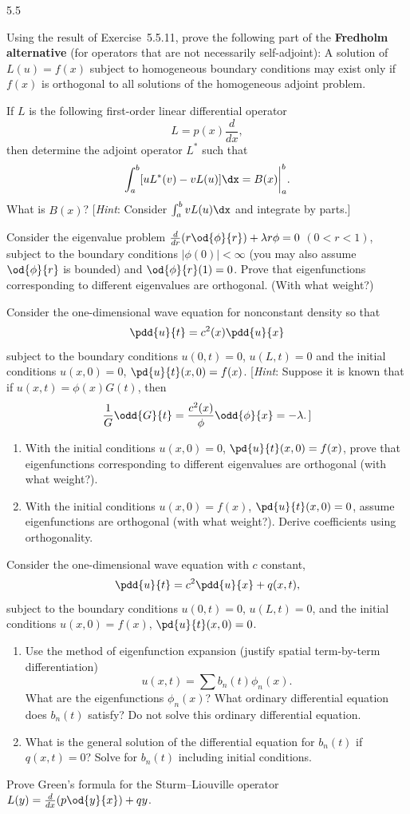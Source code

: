 \begin{exercises}{5.5}
\item Using the result of Exercise~5.5.11, prove the following part of the \textbf{Fredholm alternative} (for operators that are not necessarily self-adjoint): A solution of $L(u) = f(x)$ subject to homogeneous boundary conditions may exist only if $f(x)$ is orthogonal to all solutions of the homogeneous adjoint problem.

\item If $L$ is the following first-order linear differential operator
\[
L = p(x)\frac{d}{d x},
\]
then determine the adjoint operator $L^*$ such that
\[
\int_a^b [uL^*(v) - vL(u)]\dx = B(x)\bigg|_a^b.
\]
What is $B(x)$?  [\textit{Hint}: Consider $\int_a^b vL(u)\dx$ and integrate by parts.]

\item Consider the eigenvalue problem $\frac{d}{d r}(r\od{\phi}{r}) + \lambda r\phi = 0$ $(0 < r < 1)$, subject to the boundary conditions $|\phi(0)| < \infty$ (you may also assume $\od{\phi}{r}$ is bounded) and $\od{\phi}{r}(1) = 0$.  Prove that eigenfunctions corresponding to different eigenvalues are orthogonal.  (With what weight?)

\item Consider the one-dimensional wave equation for nonconstant density so that
\[
\pdd{u}{t} = c^2(x)\pdd{u}{x}
\]
subject to the boundary conditions $u(0,t) = 0$, $u(L,t) = 0$ and the initial conditions $u(x,0) = 0$, $\pd{u}{t}(x,0) = f(x)$.  [\textit{Hint}: Suppose it is known that if $u(x,t) = \phi(x)G(t)$, then
\[
\frac{1}{G}\odd{G}{t} = \frac{c^2(x)}{\phi}\odd{\phi}{x} = -\lambda.\,]
\]
\begin{enumerate}
\item With the initial conditions $u(x,0) = 0$, $\pd{u}{t}(x,0) = f(x)$, prove that eigenfunctions corresponding to different eigenvalues are orthogonal (with what weight?).
\item With the initial conditions $u(x,0) = f(x)$, $\pd{u}{t}(x,0) = 0$, assume eigenfunctions are orthogonal (with what weight?).  Derive coefficients using orthogonality.
\end{enumerate}

\item Consider the one-dimensional wave equation with $c$ constant,
\[
\pdd{u}{t} = c^2\pdd{u}{x} + q(x,t),
\]
subject to the boundary conditions $u(0,t) = 0$, $u(L,t) = 0$, and the initial conditions $u(x,0) = f(x)$, $\pd{u}{t}(x,0) = 0$.
\begin{enumerate}
\item Use the method of eigenfunction expansion (justify spatial term-by-term differentiation)
\[
u(x,t) = \sum b_n(t)\phi_n(x).
\]
What are the eigenfunctions $\phi_n(x)$?  What ordinary differential equation does $b_n(t)$ satisfy?  Do not solve this ordinary differential equation.
\item What is the general solution of the differential equation for $b_n(t)$ if $q(x,t) = 0$?  Solve for $b_n(t)$ including initial conditions.
\end{enumerate}

\item Prove Green's formula for the Sturm--Liouville operator $L(y) = \frac{d}{d x}(p\od{y}{x}) + qy$.

\end{exercises}
